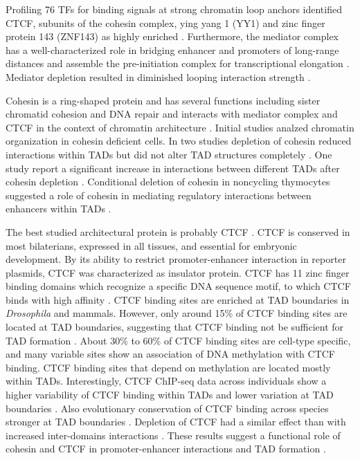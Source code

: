 \documentclass[a4paper,twoside=true,openright,parskip=full,chapterprefix=true,11pt,headings=normal,bibliography=totoc,listof=totoc,titlepage=on,captions=tableabove,draft=false]{scrreprt}
\theoremstyle{definition}
\theoremstyle{definition}
\theoremstyle{definition}
\theoremstyle{remark}
\begin{document}
Profiling 76 TFs for binding signals at strong chromatin loop anchors
identified CTCF, subunits of the cohesin complex, ying yang 1 (YY1) and
zinc finger protein 143 (ZNF143) as highly enriched \citep{Rao2014}.
Furthermore, the mediator complex has a well-characterized role in
bridging enhancer and promoters of long-range distances and assemble the
pre-initiation complex for transcriptional elongation \citep{Allen2015}.
Mediator depletion resulted in diminished looping interaction strength
\citep{Bonev2016}.

Cohesin is a ring-shaped protein and has several functions including
sister chromatid cohesion and DNA repair and interacts with mediator
complex and CTCF in the context of chromatin architecture
\citep{Bonev2016, Merkenschlager2016}. Initial studies analzed chromatin
organization in cohesin deficient cells. In two studies depletion of
cohesin reduced interactions within TADs but did not alter TAD
structures completely \citep{Seitan2013, Zuin2014}. One study report a
significant increase in interactions between different TADs after
cohesin depletion \citep{Sofueva2013}. Conditional deletion of cohesin
in noncycling thymocytes suggested a role of cohesin in mediating
regulatory interactions between enhancers within TADs
\citep{Ing-simmons2015}.

The best studied architectural protein is probably CTCF \citep{Ong2014}.
CTCF is conserved in most bilaterians, expressed in all tissues, and
essential for embryonic development. By its ability to restrict
promoter-enhancer interaction in reporter plasmids, CTCF was
characterized as insulator protein. CTCF has 11 zinc finger binding
domains which recognize a specific DNA sequence motif, to which CTCF
binds with high affinity \citep{Kim2007, Nagy2016}. CTCF binding sites
are enriched at TAD boundaries in \emph{Drosophila} and mammals.
However, only around 15\% of CTCF binding sites are located at TAD
boundaries, suggesting that CTCF binding not be sufficient for TAD
formation \citep{Bonev2016}. About 30\% to 60\% of CTCF binding sites
are cell-type specific, and many variable sites show an association of
DNA methylation with CTCF binding. CTCF binding sites that depend on
methylation are located mostly within TADs. Interestingly, CTCF ChIP-seq
data across individuals show a higher variability of CTCF binding within
TADs and lower variation at TAD boundaries \citep{Ruiz-Velasco2017}.
Also evolutionary conservation of CTCF binding across species stronger
at TAD boundaries \citep{VietriRudan2015}. Depletion of CTCF had a
similar effect than with increased inter-domains interactions
\citep{Seitan2013, Zuin2014}. These results suggest a functional role of
cohesin and CTCF in promoter-enhancer interactions and TAD formation
\citep{Pombo2015}.
\end{document}
